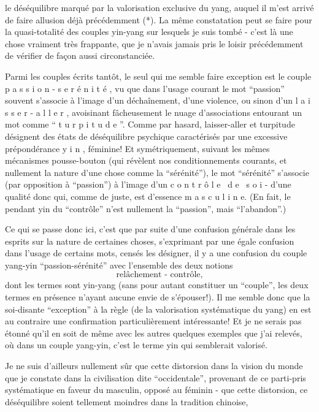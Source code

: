 
le déséquilibre marqué par la valorisation exclusive du yang, auquel il m'est arrivé de faire allusion déjà précédemment (*). La même constatation peut se faire pour la quasi-totalité des couples yin-yang sur lesquels je suis tombé - c'est là une chose vraiment très frappante, que je n'avais jamais pris le loisir précédemment de vérifier de façon aussi circonstanciée.

Parmi les couples écrits tantôt, le seul qui me semble faire exception est le couple p a s s i o n - s e r é n i t é , vu que dans l'usage courant\handwritten{,} le mot ``passion'' souvent s'associe à l'image d'un déchaînement, d'une violence, ou sinon d'un l a i s s e r - a l l e r , avoisinant fâcheusement le nuage d'associations entourant un mot comme `` t u r p i t u d e ''. Comme par hasard, laisser-aller et turpitude désignent des états de déséquilibre psychique caractérisés par une excessive prépondérance y i n , féminine! Et symétriquement, suivant les mêmes mécanismes pousse-bouton (qui révèlent nos conditionnements courants, et nullement la nature d'une chose comme la ``sérénité''), le mot ``sérénité'' s'associe (par opposition à ``passion'') à l'image d'un c o n t r ô l e \ d e \ s o i - d'une qualité donc qui, comme de juste, est d'essence m a s c u l i n e. (En fait, le pendant yin du ``contrôle'' n'est nullement la ``passion'', mais ``l'abandon''.)

Ce qui se passe donc ici, c'est que par suite d'une confusion générale dans les esprits sur la nature de certaines choses, s'exprimant par une égale confusion dans l'usage de certains mots, censés les désigner, il y a une confusion du couple yang-yin ``passion-sérénité'' avec l'ensemble des deux notions
\[ \text{relâchement - contrôle,} \]
dont les termes sont yin-yang (sans pour autant constituer un ``couple'', les deux termes en présence n'ayant aucune envie de s'épouser!). Il me semble donc que la soi-disante ``exception'' à la règle (de la valorisation systématique du yang) en est au contraire une confirmation particulièrement intéressante! Et je ne serais pas étonné qu'il en soit de même avec les autres quelques exemples que j'ai relevés, où dans un couple yang-yin, c'est le terme yin qui semblerait valorisé.

Je ne suis d'ailleurs nullement sûr que cette distorsion dans la vision du monde que je constate dans la civilisation dite ``occidentale'', provenant de ce parti-pris systématique en faveur du masculin, opposé au féminin - que cette distorsion, ce déséquilibre soient tellement moindres dans la tradition chinoise,

